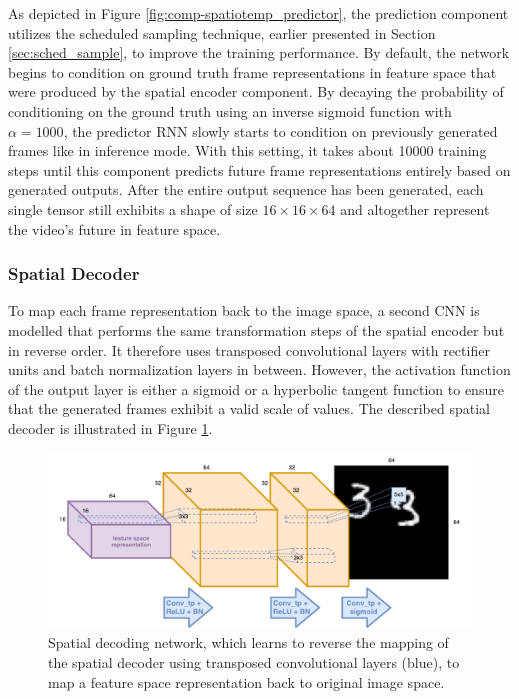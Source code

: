 As depicted in Figure \ref{fig:comp-spatiotemp_predictor}, the prediction component utilizes the scheduled sampling technique, earlier presented in Section \ref{sec:sched_sample}, to improve the training performance. By default, the network begins to condition on ground truth frame representations in feature space that were produced by the spatial encoder component. By decaying the probability of conditioning on the ground truth using an inverse sigmoid function with $\alpha = 1000$, the predictor RNN slowly starts to condition on previously generated frames like in inference mode. With this setting, it takes about \num{10000} training steps until this component predicts future frame representations entirely based on generated outputs. After the entire output sequence has been generated, each single tensor still exhibits a shape of size $16\times16\times64$ and altogether represent the video's future in feature space.

\subsubsection{Spatial Decoder}

To map each frame representation back to the image space, a second CNN is modelled that performs the same transformation steps of the spatial encoder but in reverse order. It therefore uses transposed convolutional layers with rectifier units and batch normalization layers in between. However, the activation function of the output layer is either a sigmoid or a hyperbolic tangent function to ensure that the generated frames exhibit a valid scale of values. The described spatial decoder is illustrated in Figure \ref{fig:comp-spatial_decoder}.

\begin{figure}[htb]
	\centering
	\includegraphics[width=0.9\linewidth]{figures/comp_spatial_decoder.pdf} 
	\caption[Spatial Decoder Component]{Spatial decoding network, which learns to reverse the mapping of the spatial decoder using transposed convolutional layers (blue), to map a feature space representation back to original image space.} \label{fig:comp-spatial_decoder}
\end{figure}


